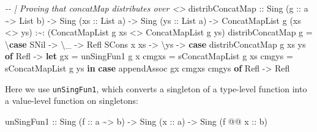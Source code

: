 \documentclass[]{article}
\newenvironment{Shaded}{}{}
\newcommand{\CommentTok}[1]{\textcolor[rgb]{0.38,0.63,0.69}{\textit{#1}}}
\newcommand{\DataTypeTok}[1]{\textcolor[rgb]{0.56,0.13,0.00}{#1}}
\newcommand{\KeywordTok}[1]{\textcolor[rgb]{0.00,0.44,0.13}{\textbf{#1}}}
\newcommand{\NormalTok}[1]{#1}
\newcommand{\OperatorTok}[1]{\textcolor[rgb]{0.40,0.40,0.40}{#1}}
\newcommand{\OtherTok}[1]{\textcolor[rgb]{0.00,0.44,0.13}{#1}}
\begin{document}
\begin{Shaded}
\begin{Highlighting}[]
\CommentTok{{-}{-} | Proving that concatMap distributes over \textless{}\textgreater{}}
\NormalTok{distribConcatMap}
\OtherTok{    ::} \DataTypeTok{Sing}\NormalTok{ (}\OtherTok{g ::}\NormalTok{ a }\OperatorTok{\textasciitilde{}\textgreater{}} \DataTypeTok{List}\NormalTok{ b)}
    \OtherTok{{-}\textgreater{}} \DataTypeTok{Sing}\NormalTok{ (}\OtherTok{xs ::} \DataTypeTok{List}\NormalTok{ a)}
    \OtherTok{{-}\textgreater{}} \DataTypeTok{Sing}\NormalTok{ (}\OtherTok{ys ::} \DataTypeTok{List}\NormalTok{ a)}
    \OtherTok{{-}\textgreater{}} \DataTypeTok{ConcatMapList}\NormalTok{ g (xs }\OperatorTok{\textless{}\textgreater{}}\NormalTok{ ys) }\OperatorTok{:\textasciitilde{}:}\NormalTok{ (}\DataTypeTok{ConcatMapList}\NormalTok{ g xs }\OperatorTok{\textless{}\textgreater{}} \DataTypeTok{ConcatMapList}\NormalTok{ g ys)}
\NormalTok{distribConcatMap g }\OtherTok{=}\NormalTok{ \textbackslash{}}\KeywordTok{case}
    \DataTypeTok{SNil} \OtherTok{{-}\textgreater{}}\NormalTok{ \textbackslash{}\_ }\OtherTok{{-}\textgreater{}} \DataTypeTok{Refl}
    \DataTypeTok{SCons}\NormalTok{ x xs }\OtherTok{{-}\textgreater{}}\NormalTok{ \textbackslash{}ys }\OtherTok{{-}\textgreater{}}
      \KeywordTok{case}\NormalTok{ distribConcatMap g xs ys }\KeywordTok{of}
        \DataTypeTok{Refl} \OtherTok{{-}\textgreater{}}
          \KeywordTok{let}\NormalTok{ gx    }\OtherTok{=}\NormalTok{ unSingFun1 g x}
\NormalTok{              cmgxs }\OtherTok{=}\NormalTok{ sConcatMapList g xs}
\NormalTok{              cmgys }\OtherTok{=}\NormalTok{ sConcatMapList g ys}
          \KeywordTok{in}  \KeywordTok{case}\NormalTok{ appendAssoc gx cmgxs cmgys }\KeywordTok{of}
                \DataTypeTok{Refl} \OtherTok{{-}\textgreater{}} \DataTypeTok{Refl}
\end{Highlighting}
\end{Shaded}

Here we use \texttt{unSingFun1}, which converts a singleton of a type-level
function into a value-level function on singletons:

\begin{Shaded}
\begin{Highlighting}[]
\NormalTok{unSingFun1}
\OtherTok{    ::} \DataTypeTok{Sing}\NormalTok{  (}\OtherTok{f      ::}\NormalTok{ a }\OperatorTok{\textasciitilde{}\textgreater{}}\NormalTok{ b)}
    \OtherTok{{-}\textgreater{}} \DataTypeTok{Sing}\NormalTok{  (}\OtherTok{x      ::}\NormalTok{ a)}
    \OtherTok{{-}\textgreater{}} \DataTypeTok{Sing}\NormalTok{  (f }\OperatorTok{@@}\OtherTok{ x ::}\NormalTok{ b)}
\end{Highlighting}
\end{Shaded}
\end{document}
